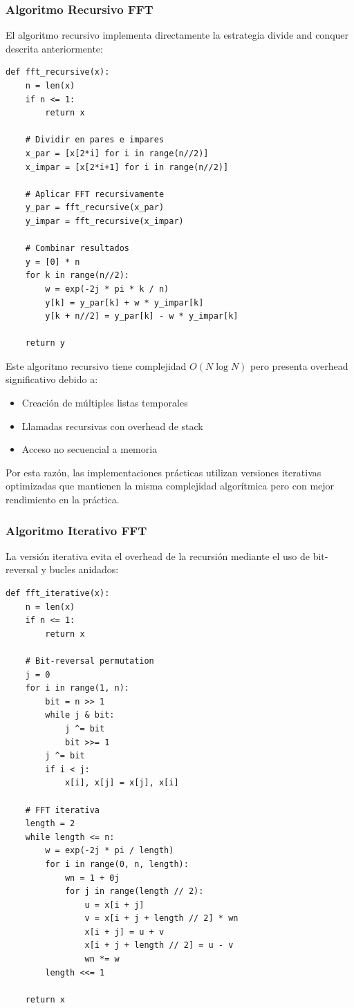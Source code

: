 \documentclass[a4paper]{article}
\begin{document}
\subsubsection{Algoritmo Recursivo FFT}

El algoritmo recursivo implementa directamente la estrategia divide and conquer descrita anteriormente:

\begin{verbatim}
def fft_recursive(x):
    n = len(x)
    if n <= 1:
        return x
    
    # Dividir en pares e impares
    x_par = [x[2*i] for i in range(n//2)]
    x_impar = [x[2*i+1] for i in range(n//2)]
    
    # Aplicar FFT recursivamente
    y_par = fft_recursive(x_par)
    y_impar = fft_recursive(x_impar)
    
    # Combinar resultados
    y = [0] * n
    for k in range(n//2):
        w = exp(-2j * pi * k / n)
        y[k] = y_par[k] + w * y_impar[k]
        y[k + n//2] = y_par[k] - w * y_impar[k]
    
    return y
\end{verbatim}

Este algoritmo recursivo tiene complejidad $O(N \log N)$ pero presenta overhead significativo debido a:
\begin{itemize}
    \item Creación de múltiples listas temporales
    \item Llamadas recursivas con overhead de stack
    \item Acceso no secuencial a memoria
\end{itemize}

Por esta razón, las implementaciones prácticas utilizan versiones iterativas optimizadas que mantienen la misma complejidad algorítmica pero con mejor rendimiento en la práctica.

\subsubsection{Algoritmo Iterativo FFT}

La versión iterativa evita el overhead de la recursión mediante el uso de bit-reversal y bucles anidados:

\begin{verbatim}
def fft_iterative(x):
    n = len(x)
    if n <= 1:
        return x
    
    # Bit-reversal permutation
    j = 0
    for i in range(1, n):
        bit = n >> 1
        while j & bit:
            j ^= bit
            bit >>= 1
        j ^= bit
        if i < j:
            x[i], x[j] = x[j], x[i]
    
    # FFT iterativa
    length = 2
    while length <= n:
        w = exp(-2j * pi / length)
        for i in range(0, n, length):
            wn = 1 + 0j
            for j in range(length // 2):
                u = x[i + j]
                v = x[i + j + length // 2] * wn
                x[i + j] = u + v
                x[i + j + length // 2] = u - v
                wn *= w
        length <<= 1
    
    return x
\end{verbatim}
\end{document}
